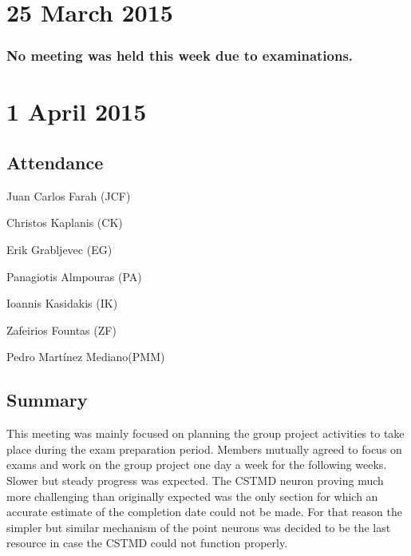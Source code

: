 \documentclass[a4paper,11pt]{article}
\begin{document}
\section*{25 March 2015}
\subsubsection*{No meeting was held this week due to examinations.}

\maketitle
\section*{1 April 2015}
\subsection*{Attendance}
\begin{compactenum}
\item Juan Carlos Farah (JCF)
\item Christos Kaplanis (CK)
\item Erik Grabljevec (EG)
\item Panagiotis Almpouras (PA)
\item Ioannis Kasidakis (IK)
\item Zafeirios Fountas (ZF)
\item Pedro Martínez Mediano(PMM)
\end{compactenum}

\subsection*{Summary}
This meeting was mainly focused on planning the group project activities to take place during the exam preparation period. Members mutually agreed to focus on exams and work on the group project one day a week for the following weeks. Slower but steady progress was expected.  The CSTMD neuron proving much more challenging than originally expected was the only section for which an accurate estimate of the completion date could not be made. For that reason the simpler but similar mechanism of the point neurons was decided to be the last resource in case the CSTMD could not function properly.

\maketitle
\end{document}
